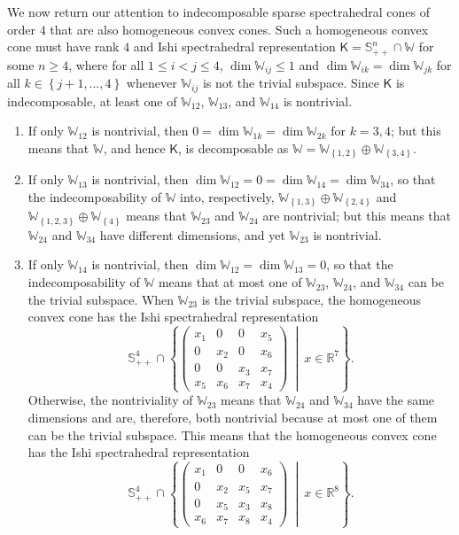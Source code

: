 \documentclass[oneside]{amsart}
\theoremstyle{plain}
\theoremstyle{definition}
\theoremstyle{remark}
\numberwithin{equation}{section}
\begin{document}
We now return our attention to indecomposable sparse spectrahedral cones of
order $4$ that are also homogeneous convex cones. Such a homogeneous convex
cone must have rank $4$ and Ishi spectrahedral representation $\mathsf{K} =
\mathbb{S}^{n}_{++} \cap \mathbb{W}$ for some $n \geq 4$, where for all $1
\leq i < j \leq 4$, $\dim \mathbb{W}_{ij} \leq 1$ and $\dim \mathbb{W}_{ik}
= \dim \mathbb{W}_{jk}$ for all $k \in \left\{j+1, \dotsc, 4\right\}$
whenever $\mathbb{W}_{ij}$ is not the trivial subspace. Since $\mathsf{K}$
is indecomposable, at least one of $\mathbb{W}_{12}$, $\mathbb{W}_{13}$,
and $\mathbb{W}_{14}$ is nontrivial.
\begin{enumerate}[label=(\roman*)]
\item If only $\mathbb{W}_{12}$ is nontrivial, then $0 = \dim
\mathbb{W}_{1k} = \dim \mathbb{W}_{2k}$ for $k = 3, 4$; but this means that
$\mathbb{W}$, and hence $\mathsf{K}$, is decomposable as $\mathbb{W} =
\mathbb{W}_{\left\{1,2\right\}} \oplus \mathbb{W}_{\left\{3,4\right\}}$.

\item If only $\mathbb{W}_{13}$ is nontrivial, then $\dim \mathbb{W}_{12} =
0 = \dim \mathbb{W}_{14} = \dim \mathbb{W}_{34}$, so that the
indecomposability of $\mathbb{W}$ into, respectively,
$\mathbb{W}_{\left\{1,3\right\}} \oplus \mathbb{W}_{\left\{2,4\right\}}$
and $\mathbb{W}_{\left\{1,2,3\right\}} \oplus
\mathbb{W}_{\left\{4\right\}}$ means that $\mathbb{W}_{23}$ and
$\mathbb{W}_{24}$ are nontrivial; but this means that $\mathbb{W}_{24}$ and
$\mathbb{W}_{34}$ have different dimensions, and yet $\mathbb{W}_{23}$ is
nontrivial.

\item If only $\mathbb{W}_{14}$ is nontrivial, then $\dim \mathbb{W}_{12} =
\dim \mathbb{W}_{13} = 0$, so that the indecomposability of $\mathbb{W}$
means that at most one of $\mathbb{W}_{23}$, $\mathbb{W}_{24}$, and
$\mathbb{W}_{34}$ can be the trivial subspace. When $\mathbb{W}_{23}$ is
the trivial subspace, the homogeneous convex cone has the Ishi
spectrahedral representation
\[
\mathbb{S}^{4}_{++} \cap \left\{
\begin{pmatrix}
x_{1} & 0 & 0 & x_{5}
\\
0 & x_{2} & 0 & x_{6}
\\
0 & 0 & x_{3} & x_{7}
\\
x_{5} & x_{6} & x_{7} & x_{4}
\end{pmatrix}
\ \middle|\ x \in \mathbb{R}^{7}\right\}.
\]
Otherwise, the nontriviality of $\mathbb{W}_{23}$ means that
$\mathbb{W}_{24}$ and $\mathbb{W}_{34}$ have the same dimensions and are,
therefore, both nontrivial because at most one of them can be the trivial
subspace. This means that the homogeneous convex cone has the Ishi
spectrahedral representation
\[
\mathbb{S}^{4}_{++} \cap \left\{
\begin{pmatrix}
x_{1} & 0 & 0 & x_{6}
\\
0 & x_{2} & x_{5} & x_{7}
\\
0 & x_{5} & x_{3} & x_{8}
\\
x_{6} & x_{7} & x_{8} & x_{4}
\end{pmatrix}
\ \middle|\ x \in \mathbb{R}^{8}\right\}.
\]


\end{enumerate}
\end{document}
